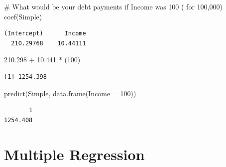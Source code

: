 \documentclass[
  letterpaper,
  DIV=11,
  numbers=noendperiod]{scrreprt}
\newenvironment{Shaded}{\begin{snugshade}}{\end{snugshade}}
\newcommand{\AttributeTok}[1]{\textcolor[rgb]{0.40,0.45,0.13}{#1}}
\newcommand{\CommentTok}[1]{\textcolor[rgb]{0.37,0.37,0.37}{#1}}
\newcommand{\DecValTok}[1]{\textcolor[rgb]{0.68,0.00,0.00}{#1}}
\newcommand{\FloatTok}[1]{\textcolor[rgb]{0.68,0.00,0.00}{#1}}
\newcommand{\FunctionTok}[1]{\textcolor[rgb]{0.28,0.35,0.67}{#1}}
\newcommand{\NormalTok}[1]{\textcolor[rgb]{0.00,0.23,0.31}{#1}}
\newcommand{\SpecialCharTok}[1]{\textcolor[rgb]{0.37,0.37,0.37}{#1}}
\begin{document}
\begin{Shaded}
\begin{Highlighting}[]
\CommentTok{\# What would be your debt payments if Income was 100 ( for 100,000)}
\FunctionTok{coef}\NormalTok{(Simple)}
\end{Highlighting}
\end{Shaded}

\begin{verbatim}
(Intercept)      Income 
  210.29768    10.44111 
\end{verbatim}

\begin{Shaded}
\begin{Highlighting}[]
\FloatTok{210.298} \SpecialCharTok{+} \FloatTok{10.441} \SpecialCharTok{*}\NormalTok{ (}\DecValTok{100}\NormalTok{)}
\end{Highlighting}
\end{Shaded}

\begin{verbatim}
[1] 1254.398
\end{verbatim}

\begin{Shaded}
\begin{Highlighting}[]
\FunctionTok{predict}\NormalTok{(Simple, }\FunctionTok{data.frame}\NormalTok{(}\AttributeTok{Income =} \DecValTok{100}\NormalTok{))}
\end{Highlighting}
\end{Shaded}

\begin{verbatim}
       1 
1254.408 
\end{verbatim}


\chapter{Multiple Regression}\label{multiple-regression}
\end{document}
